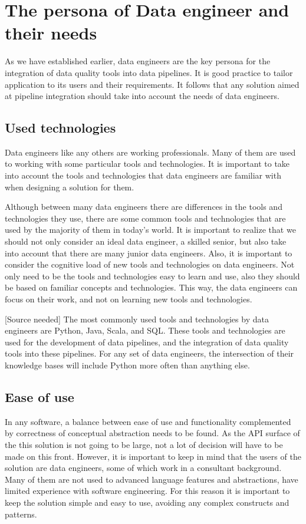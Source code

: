 \section{The persona of Data engineer and their needs}

As we have established earlier, data engineers are the key persona for the integration of data quality tools into data pipelines. It is good practice to tailor application to its users and their requirements. It follows that any solution aimed at pipeline integration should take into account the needs of data engineers.

\subsection{Used technologies}

Data engineers like any others are working professionals. Many of them are used to working with some particular tools and technologies. It is important to take into account the tools and technologies that data engineers are familiar with when designing a solution for them.

Although between many data engineers there are differences in the tools and technologies they use, there are some common tools and technologies that are used by the majority of them in today's world. It is important to realize that we should not only consider an ideal data engineer, a skilled senior, but also take into account that there are many junior data engineers. Also, it is important to consider the cognitive load of new tools and technologies on data engineers. Not only need to be the tools and technologies easy to learn and use, also they should be based on familiar concepts and technologies. This way, the data engineers can focus on their work, and not on learning new tools and technologies. 

[Source needed] The most commonly used tools and technologies by data engineers are Python, Java, Scala, and SQL. These tools and technologies are used for the development of data pipelines, and the integration of data quality tools into these pipelines. For any set of data engineers, the intersection of their knowledge bases will include Python more often than anything else.

\subsection{Ease of use}

In any software, a balance between ease of use and functionality complemented by correctness of conceptual abstraction needs to be found. As the API surface of the this solution is not going to be large, not a lot of decision will have to be made on this front. However, it is important to keep in mind that the users of the solution are data engineers, some of which work in a consultant background. Many of them are not used to advanced language features and abstractions, have limited experience with software engineering. For this reason it is important to keep the solution simple and easy to use, avoiding any complex constructs and patterns.

